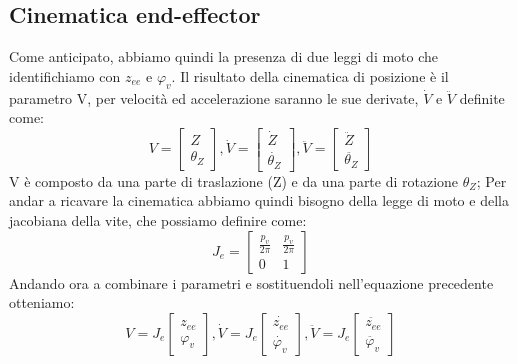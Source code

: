 \subsection{Cinematica end-effector}
Come anticipato, abbiamo quindi la presenza di due leggi di moto che identifichiamo con $z_{ee}$ e $\varphi_v$. Il risultato della cinematica di posizione è il parametro V, per velocità ed accelerazione saranno le sue derivate, $\dot{V}$ e $\ddot{V}$ definite come: 
\begin{equation*}
	V = 
	\begin{bmatrix}
		Z \\ 
		\theta_Z
	\end{bmatrix}, 
	\dot{V} = 
	\begin{bmatrix}
		\dot{Z} \\ \dot{\theta_Z}
	\end{bmatrix},
	\ddot{V} =
	\begin{bmatrix}
		\ddot{Z} \\ \ddot{\theta_Z}
	\end{bmatrix}
\end{equation*}
V è composto da una parte di traslazione (Z) e da una parte di rotazione $\theta_Z$; Per andar a ricavare la cinematica abbiamo quindi bisogno della legge di moto e della jacobiana della vite, che possiamo definire come:
\begin{equation}
J_e =
    \begin{bmatrix}
    \frac{p_v}{2 \pi} & \frac{p_v}{2 \pi} \\
    0 & 1
    \end{bmatrix}
\end{equation}
Andando ora a combinare i parametri e sostituendoli nell'equazione precedente otteniamo:
\begin{equation}
    V = J_e \begin{bmatrix}
    z_{ee} \\ \varphi_v
    \end{bmatrix},
    \dot{V} = J_e \begin{bmatrix}
    \dot{z_{ee}} \\ \dot{\varphi_v}
    \end{bmatrix},
    \ddot{V} = J_e \begin{bmatrix}
    \ddot{z_{ee}} \\ \ddot{\varphi_v}
    \end{bmatrix}
\end{equation}

